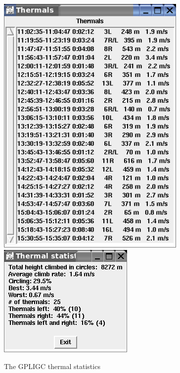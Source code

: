 \begin{figure}[h]
\caption{\label{thermals}The GPLIGC thermal statistics}
\begin{center}
\includegraphics[height=13cm]{png/thermstat}
\includegraphics{png/thermstat2}
\end{center}
\end{figure}


